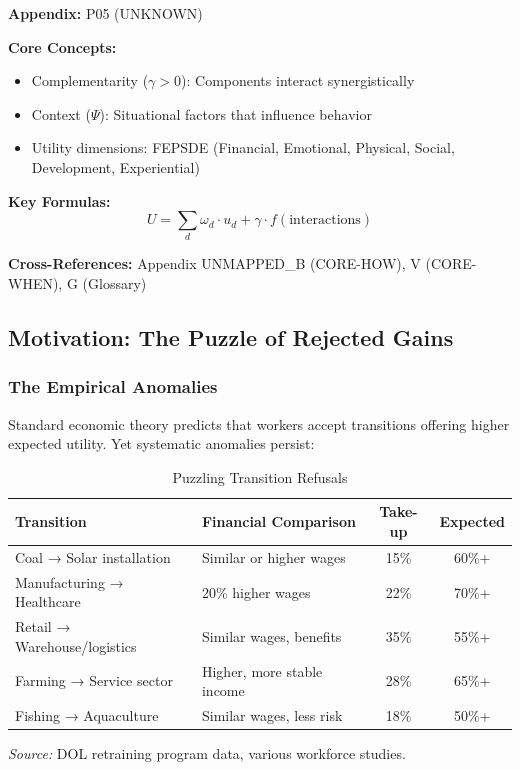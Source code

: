 \begin{tcolorbox}[colback=blue!5!white, colframe=blue!75!black,
    title=Quick Reference: Unknown]

\textbf{Appendix:} P05 (UNKNOWN)

\textbf{Core Concepts:}
\begin{itemize}[nosep]
\item Complementarity ($\gamma > 0$): Components interact synergistically
\item Context ($\Psi$): Situational factors that influence behavior
\item Utility dimensions: FEPSDE (Financial, Emotional, Physical, Social, Development, Experiential)
\end{itemize}

\textbf{Key Formulas:}
\begin{equation}
U = \sum_d \omega_d \cdot u_d + \gamma \cdot f(\text{interactions})
\end{equation}

\textbf{Cross-References:} Appendix UNMAPPED_B (CORE-HOW), V (CORE-WHEN), G (Glossary)
\end{tcolorbox}

\subsection{Motivation: The Puzzle of Rejected Gains}

\subsubsection{The Empirical Anomalies}

Standard economic theory predicts that workers accept transitions offering 
higher expected utility. Yet systematic anomalies persist:

\begin{table}[htbp]
\centering
\caption{Puzzling Transition Refusals}
\label{tab:refusal-puzzles}
\small
\begin{tabular}{@{}p{4cm}p{4cm}cc@{}}
\toprule
\textbf{Transition} & \textbf{Financial Comparison} & \textbf{Take-up} & \textbf{Expected} \\
\midrule
Coal → Solar installation & Similar or higher wages & 15\% & 60\%+ \\
Manufacturing → Healthcare & 20\% higher wages & 22\% & 70\%+ \\
Retail → Warehouse/logistics & Similar wages, benefits & 35\% & 55\%+ \\
Farming → Service sector & Higher, more stable income & 28\% & 65\%+ \\
Fishing → Aquaculture & Similar wages, less risk & 18\% & 50\%+ \\
\bottomrule
\end{tabular}
\begin{flushleft}
\small\textit{Source:} DOL retraining program data, various workforce studies.
\end{flushleft}
\end{table}

